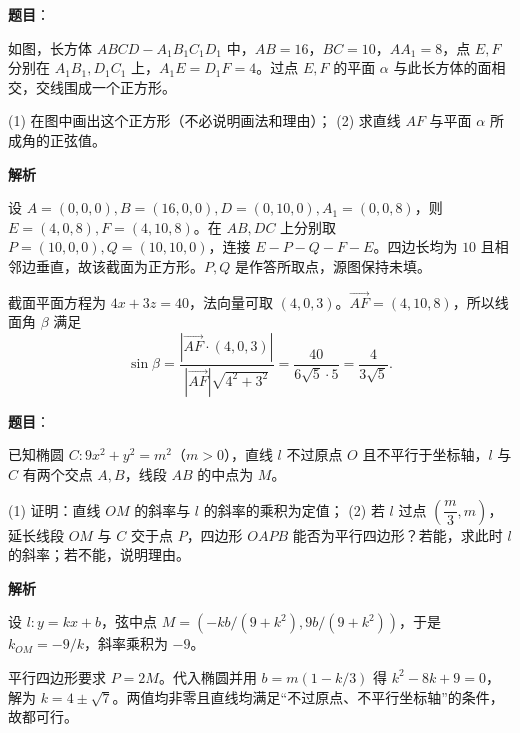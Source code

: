 \begin{answer}

\textbf{题目}：

如图，长方体 $ABCD-A_1B_1C_1D_1$ 中，$AB=16$，$BC=10$，$AA_1=8$，点 $E,F$ 分别在 $A_1B_1,D_1C_1$ 上，$A_1E=D_1F=4$。过点 $E,F$ 的平面 $\alpha$ 与此长方体的面相交，交线围成一个正方形。

(1) 在图中画出这个正方形（不必说明画法和理由）；  
(2) 求直线 $AF$ 与平面 $\alpha$ 所成角的正弦值。
\nopagebreak[4]
\begin{center}\end{center}
\nopagebreak[4]
\textbf{解析}


设 $A=(0,0,0),B=(16,0,0),D=(0,10,0),A_1=(0,0,8)$，则 $E=(4,0,8),F=(4,10,8)$。在 $AB,DC$ 上分别取 $P=(10,0,0),Q=(10,10,0)$，连接 $E-P-Q-F-E$。四边长均为 $10$ 且相邻边垂直，故该截面为正方形。$P,Q$ 是作答所取点，源图保持未填。
\nopagebreak[4]
\begin{center}\end{center}
\nopagebreak[4]

截面平面方程为 $4x+3z=40$，法向量可取 $(4,0,3)$。$\overrightarrow{AF}=(4,10,8)$，所以线面角 $\beta$ 满足
\nopagebreak[4]
\[\sin\beta=\frac{|\overrightarrow{AF}\cdot(4,0,3)|}{|\overrightarrow{AF}|\sqrt{4^2+3^2}}=\frac{40}{6\sqrt5\cdot5}=\frac4{3\sqrt5}.\]



\end{answer}
\begin{answer}

\textbf{题目}：

已知椭圆 $C:9x^2+y^2=m^2$（$m>0$），直线 $l$ 不过原点 $O$ 且不平行于坐标轴，$l$ 与 $C$ 有两个交点 $A,B$，线段 $AB$ 的中点为 $M$。

(1) 证明：直线 $OM$ 的斜率与 $l$ 的斜率的乘积为定值；  
(2) 若 $l$ 过点 $\left(\dfrac m3,m\right)$，延长线段 $OM$ 与 $C$ 交于点 $P$，四边形 $OAPB$ 能否为平行四边形？若能，求此时 $l$ 的斜率；若不能，说明理由。

\textbf{解析}


设 $l:y=kx+b$，弦中点 $M=(-kb/(9+k^2),9b/(9+k^2))$，于是 $k_{OM}=-9/k$，斜率乘积为 $-9$。


平行四边形要求 $P=2M$。代入椭圆并用 $b=m(1-k/3)$ 得 $k^2-8k+9=0$，解为 $k=4\pm\sqrt7$。两值均非零且直线均满足“不过原点、不平行坐标轴”的条件，故都可行。



\end{answer}
